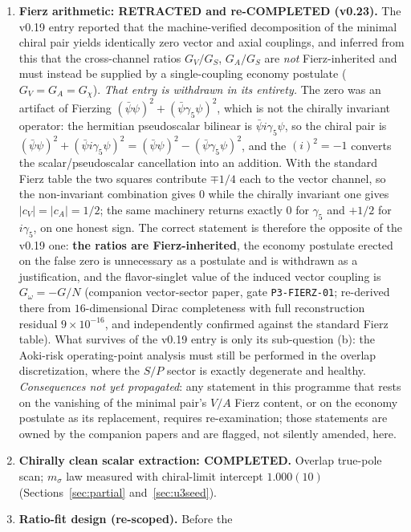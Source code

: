 \documentclass[11pt,a4paper]{article}
\begin{document}
\begin{enumerate}
\item \textbf{Fierz arithmetic: RETRACTED and re-COMPLETED
(v0.23).}  The v0.19 entry reported that the machine-verified
decomposition of the minimal chiral pair yields identically zero
vector and axial couplings, and inferred from this that the
cross-channel ratios $G_V/G_S$, $G_A/G_S$ are \emph{not}
Fierz-inherited and must instead be supplied by a single-coupling
economy postulate ($G_V = G_A = G_\chi$).  \emph{That entry is
withdrawn in its entirety.}  The zero was an artifact of Fierzing
$(\bar\psi\psi)^2 + (\bar\psi\gamma_5\psi)^2$, which is not the
chirally invariant operator: the hermitian pseudoscalar bilinear
is $\bar\psi i\gamma_5\psi$, so the chiral pair is
$(\bar\psi\psi)^2 + (\bar\psi i\gamma_5\psi)^2
 = (\bar\psi\psi)^2 - (\bar\psi\gamma_5\psi)^2$, and the
$(i)^2 = -1$ converts the scalar/pseudoscalar cancellation into an
addition.  With the standard Fierz table the two squares
contribute $\mp 1/4$ each to the vector channel, so the
non-invariant combination gives $0$ while the chirally invariant
one gives $|c_V| = |c_A| = 1/2$; the same machinery returns
exactly $0$ for $\gamma_5$ and $+1/2$ for $i\gamma_5$, on one
honest sign.  The correct statement is therefore the opposite of
the v0.19 one: \textbf{the ratios are Fierz-inherited}, the
economy postulate erected on the false zero is unnecessary as a
postulate and is withdrawn as a justification, and the
flavor-singlet value of the induced vector coupling is
$G_\omega = -G/N$ (companion vector-sector paper, gate
\texttt{P3-FIERZ-01}; re-derived there from $16$-dimensional
Dirac completeness with full reconstruction residual
$9\times10^{-16}$, and independently confirmed against the
standard Fierz table).  What survives of the v0.19 entry is only
its sub-question (b): the Aoki-risk operating-point analysis must
still be performed in the overlap discretization, where the $S/P$
sector is exactly degenerate and healthy.
\emph{Consequences not yet propagated}: any statement in this
programme that rests on the vanishing of the minimal pair's $V/A$
Fierz content, or on the economy postulate as its replacement,
requires re-examination; those statements are owned by the
companion papers and are flagged, not silently amended, here.
\item \textbf{Chirally clean scalar extraction: COMPLETED.}
Overlap true-pole scan; $m_\sigma$ law measured with chiral-limit
intercept $1.000(10)$ (Sections~\ref{sec:partial}
and~\ref{sec:u3seed}).
\item \textbf{Ratio-fit design (re-scoped).}  Before the

\end{enumerate}
\end{document}
